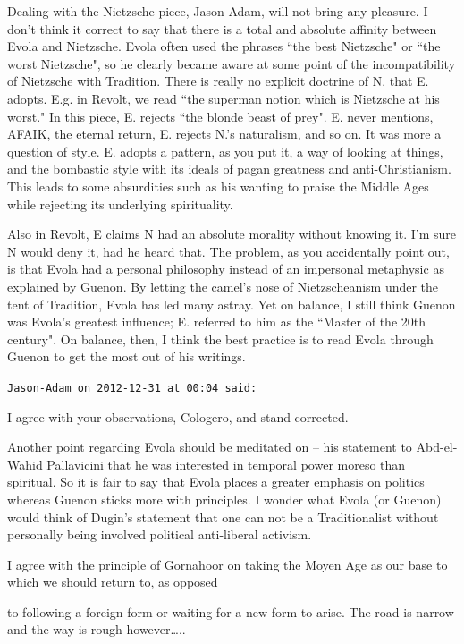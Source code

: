 \begin{footnotesize}
\begin{sffamily}
Dealing with the Nietzsche piece, Jason-Adam, will not bring any pleasure. I don't think it correct to say that there is a total and absolute affinity between Evola and Nietzsche. Evola often used the phrases ``the best Nietzsche" or ``the worst Nietzsche", so he clearly became aware at some point of the incompatibility of Nietzsche with Tradition. There is really no explicit doctrine of N. that E. adopts. E.g. in Revolt, we read ``the superman notion which is Nietzsche at his worst." In this piece, E. rejects ``the blonde beast of prey". E. never mentions, AFAIK, the eternal return, E. rejects N.'s naturalism, and so on. It was more a question of style. E. adopts a pattern, as you put it, a way of looking at things, and the bombastic style with its ideals of pagan greatness and anti-Christianism. This leads to some absurdities such as his wanting to praise the Middle Ages while rejecting its underlying spirituality.

Also in Revolt, E claims N had an absolute morality without knowing it. I'm sure N would deny it, had he heard that. The problem, as you accidentally point out, is that Evola had a personal philosophy instead of an impersonal metaphysic as explained by Guenon. By letting the camel's nose of Nietzscheanism under the tent of Tradition, Evola has led many astray. Yet on balance, I still think Guenon was Evola's greatest influence; E. referred to him as the ``Master of the 20th century". On balance, then, I think the best practice is to read Evola through Guenon to get the most out of his writings.


\hfill

\texttt{Jason-Adam on 2012-12-31 at 00:04 said: }

I agree with your observations, Cologero, and stand corrected.

Another point regarding Evola should be meditated on – his statement to Abd-el-Wahid Pallavicini that he was interested in temporal power moreso than spiritual. So it is fair to say that Evola places a greater emphasis on politics whereas Guenon sticks more with principles. I wonder what Evola (or Guenon) would think of Dugin's statement that one can not be a Traditionalist without personally being involved political anti-liberal activism. 

I agree with the principle of Gornahoor on taking the Moyen Age as our base to which we should return to, as opposed

to following a foreign form or waiting for a new form to arise. The road is narrow and the way is rough however…..


\end{sffamily}
\end{footnotesize}

